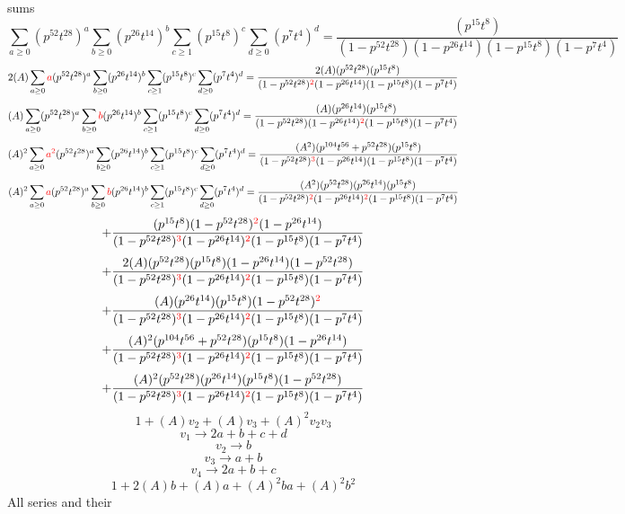\documentclass{article}
\begin{document}
sums\[\sum_{a\geq{0}}(p^{52}t^{28})^{a}\sum_{b\geq{0}}(p^{26}t^{14})^{b}\sum_{c\geq{1}}(p^{15}t^{8})^{c}\sum_{d\geq{0}}(p^{7}t^{4})^{d}=\frac{(p^{15}t^{8})}{(1-p^{52}t^{28})(1-p^{26}t^{14})(1-p^{15}t^{8})(1-p^{7}t^{4})}\]\[2(A)\sum_{a\geq{0}}\textcolor{red}{a}(p^{52}t^{28})^{a}\sum_{b\geq{0}}(p^{26}t^{14})^{b}\sum_{c\geq{1}}(p^{15}t^{8})^{c}\sum_{d\geq{0}}(p^{7}t^{4})^{d}=\frac{2(A)(p^{52}t^{28})(p^{15}t^{8})}{(1-p^{52}t^{28})^{\textcolor{red}{2}}(1-p^{26}t^{14})(1-p^{15}t^{8})(1-p^{7}t^{4})}\]\[(A)\sum_{a\geq{0}}(p^{52}t^{28})^{a}\sum_{b\geq{0}}\textcolor{red}{b}(p^{26}t^{14})^{b}\sum_{c\geq{1}}(p^{15}t^{8})^{c}\sum_{d\geq{0}}(p^{7}t^{4})^{d}=\frac{(A)(p^{26}t^{14})(p^{15}t^{8})}{(1-p^{52}t^{28})(1-p^{26}t^{14})^{\textcolor{red}{2}}(1-p^{15}t^{8})(1-p^{7}t^{4})}\]\[(A)^{2}\sum_{a\geq{0}}\textcolor{red}{a^{2}}(p^{52}t^{28})^{a}\sum_{b\geq{0}}(p^{26}t^{14})^{b}\sum_{c\geq{1}}(p^{15}t^{8})^{c}\sum_{d\geq{0}}(p^{7}t^{4})^{d}=\frac{(A^{2})(p^{104}t^{56}+p^{52}t^{28})(p^{15}t^{8})}{(1-p^{52}t^{28})^{\textcolor{red}{3}}(1-p^{26}t^{14})(1-p^{15}t^{8})(1-p^{7}t^{4})}\]\[(A)^{2}\sum_{a\geq{0}}\textcolor{red}{a}(p^{52}t^{28})^{a}\sum_{b\geq{0}}\textcolor{red}{b}(p^{26}t^{14})^{b}\sum_{c\geq{1}}(p^{15}t^{8})^{c}\sum_{d\geq{0}}(p^{7}t^{4})^{d}=\frac{(A^{2})(p^{52}t^{28})(p^{26}t^{14})(p^{15}t^{8})}{(1-p^{52}t^{28})^{\textcolor{red}{2}}(1-p^{26}t^{14})^{\textcolor{red}{2}}(1-p^{15}t^{8})(1-p^{7}t^{4})}\]\[+\frac{(p^{15}t^{8})(1-p^{52}t^{28})^{\textcolor{red}{2}}(1-p^{26}t^{14})}{(1-p^{52}t^{28})^{\textcolor{red}{3}}(1-p^{26}t^{14})^{\textcolor{red}{2}}(1-p^{15}t^{8})(1-p^{7}t^{4})}\]\[+\frac{2(A)(p^{52}t^{28})(p^{15}t^{8})(1-p^{26}t^{14})(1-p^{52}t^{28})}{(1-p^{52}t^{28})^{\textcolor{red}{3}}(1-p^{26}t^{14})^{\textcolor{red}{2}}(1-p^{15}t^{8})(1-p^{7}t^{4})}\]\[+\frac{(A)(p^{26}t^{14})(p^{15}t^{8})(1-p^{52}t^{28})^{\textcolor{red}{2}}}{(1-p^{52}t^{28})^{\textcolor{red}{3}}(1-p^{26}t^{14})^{\textcolor{red}{2}}(1-p^{15}t^{8})(1-p^{7}t^{4})}\]\[+\frac{(A)^{2}(p^{104}t^{56}+p^{52}t^{28})(p^{15}t^{8})(1-p^{26}t^{14})}{(1-p^{52}t^{28})^{\textcolor{red}{3}}(1-p^{26}t^{14})^{\textcolor{red}{2}}(1-p^{15}t^{8})(1-p^{7}t^{4})}\]\[+\frac{(A)^{2}(p^{52}t^{28})(p^{26}t^{14})(p^{15}t^{8})(1-p^{52}t^{28})}{(1-p^{52}t^{28})^{\textcolor{red}{3}}(1-p^{26}t^{14})^{\textcolor{red}{2}}(1-p^{15}t^{8})(1-p^{7}t^{4})}\]\[1+(A)v_2+(A)v_3+(A)^2v_2v_3\]\[v_1\rightarrow{2a+b+c+d}\]\[v_2\rightarrow{b}\]\[v_3\rightarrow{a+b}\]\[v_4\rightarrow{2a+b+c}\]\[1+2(A)b+(A)a+(A)^2ba+(A)^2b^{2}\]All series and their 
\end{document}
